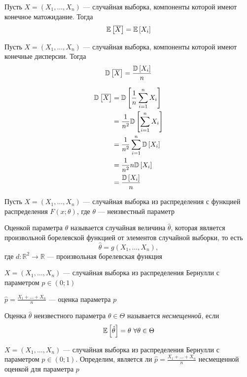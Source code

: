 \documentclass[a4paper, 10pt]{article}
\begin{document}
\state Пусть $X=(X_1,\ldots,X_n)$ — случайная выборка, компоненты которой имеют конечное матожидание. Тогда 
\begin{equation*}
    \mathbb{E}\left[\overline{X}\right]=\mathbb{E}\left[X_i\right]
\end{equation*}

\state Пусть $X=(X_1,\ldots,X_n)$ — случайная выборка, компоненты которой имеют конечные дисперсии. Тогда 
\begin{equation*}
    \mathbb{D}\left[\overline{X}\right]=\frac{\mathbb{D}\left[X_i\right]}{n}
\end{equation*}

\proof \begin{equation*}
    \begin{aligned}
        \dispersia{\overline{X}}&=\dispersia{\frac{1}{n}\sum_{i=1}^nX_i}\\
        &=\frac{1}{n^2}\dispersia{\sum_{i=1}^nX_i}\\
        &=\frac{1}{n^2}\sum_{i=1}^n\dispersia{X_i}\\
        &=\frac{1}{n^2}n\dispersia{X_i}\\
        &=\frac{\dispersia{X_i}}{n}
    \end{aligned}
\end{equation*}

 Пусть $X=(X_1,\ldots,X_n)$ — случайная выборка из распределения с функцией распределения $F(x;\theta)$, где $\theta$ — неизвестный параметр

Оценкой параметра $\theta$ называется случайная величина $\hat{\theta}$, которая является произвольной борелевской функцией от элементов случайной выборки, то есть
\begin{equation*}
    \hat{\theta}=g(X_1,\ldots,X_n),
\end{equation*}
где $d:\mathbb{R}^2\longrightarrow\mathbb{R}$ — произвольная борелевская функция

\ex  $X=(X_1,\ldots,X_n)$ — случайная выборка из распределения Бернулли с параметром $p\in(0;1)$

$\hat{p}=\displaystyle\frac{X_1+\ldots+X_n}{n}$ — оценка параметра $p$

 Оценка $\hat{\theta}$ неизвестного параметра $\theta\in\Theta$ называется \textit{несмещенной}, если 
\begin{equation*}
    \matwait{\hat{\theta}}=\theta\ \forall\theta\in\Theta
\end{equation*}

\ex  $X=(X_1,\ldots,X_n)$ — случайная выборка из распределения Бернулли с параметром $p\in(0;1)$. Определим, является ли $\hat{p}=\frac{X_1+\ldots+X_n}{n}$ несмещенной оценкой для параметра $p$
\end{document}
